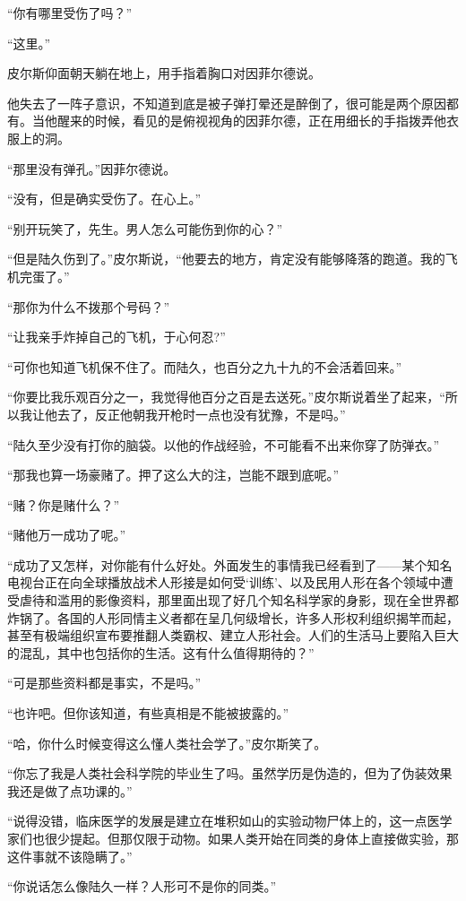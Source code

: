 “你有哪里受伤了吗？”

“这里。”

皮尔斯仰面朝天躺在地上，用手指着胸口对因菲尔德说。

他失去了一阵子意识，不知道到底是被子弹打晕还是醉倒了，很可能是两个原因都有。当他醒来的时候，看见的是俯视视角的因菲尔德，正在用细长的手指拨弄他衣服上的洞。

“那里没有弹孔。”因菲尔德说。

“没有，但是确实受伤了。在心上。”

“别开玩笑了，先生。男人怎么可能伤到你的心？”

“但是陆久伤到了。”皮尔斯说，“他要去的地方，肯定没有能够降落的跑道。我的飞机完蛋了。”

“那你为什么不拨那个号码？”

“让我亲手炸掉自己的飞机，于心何忍?”

“可你也知道飞机保不住了。而陆久，也百分之九十九的不会活着回来。”

“你要比我乐观百分之一，我觉得他百分之百是去送死。”皮尔斯说着坐了起来，“所以我让他去了，反正他朝我开枪时一点也没有犹豫，不是吗。”

“陆久至少没有打你的脑袋。以他的作战经验，不可能看不出来你穿了防弹衣。”

“那我也算一场豪赌了。押了这么大的注，岂能不跟到底呢。”

“赌？你是赌什么？”

“赌他万一成功了呢。”

“成功了又怎样，对你能有什么好处。外面发生的事情我已经看到了——某个知名电视台正在向全球播放战术人形接是如何受‘训练’、以及民用人形在各个领域中遭受虐待和滥用的影像资料，那里面出现了好几个知名科学家的身影，现在全世界都炸锅了。各国的人形同情主义者都在呈几何级增长，许多人形权利组织揭竿而起，甚至有极端组织宣布要推翻人类霸权、建立人形社会。人们的生活马上要陷入巨大的混乱，其中也包括你的生活。这有什么值得期待的？”

“可是那些资料都是事实，不是吗。”

“也许吧。但你该知道，有些真相是不能被披露的。”

“哈，你什么时候变得这么懂人类社会学了。”皮尔斯笑了。

“你忘了我是人类社会科学院的毕业生了吗。虽然学历是伪造的，但为了伪装效果我还是做了点功课的。”

“说得没错，临床医学的发展是建立在堆积如山的实验动物尸体上的，这一点医学家们也很少提起。但那仅限于动物。如果人类开始在同类的身体上直接做实验，那这件事就不该隐瞒了。”

“你说话怎么像陆久一样？人形可不是你的同类。”

